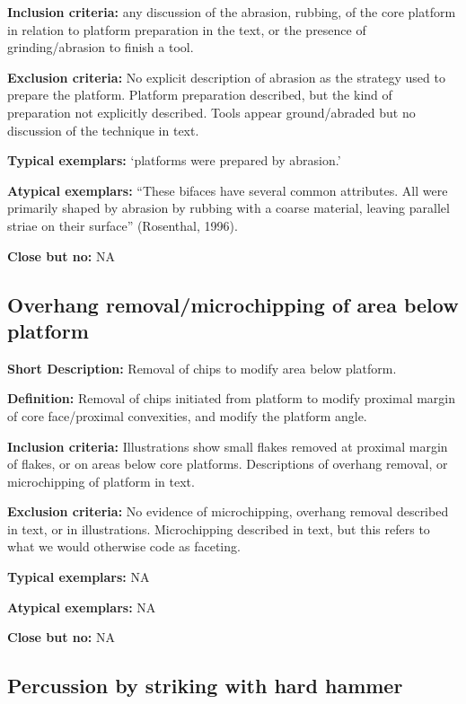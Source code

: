 \documentclass[
]{article}
\begin{document}
\textbf{Inclusion criteria:} any discussion of the abrasion, rubbing, of
the core platform in relation to platform preparation in the text, or
the presence of grinding/abrasion to finish a tool.

\textbf{Exclusion criteria:} No explicit description of abrasion as the
strategy used to prepare the platform. Platform preparation described,
but the kind of preparation not explicitly described. Tools appear
ground/abraded but no discussion of the technique in text.

\textbf{Typical exemplars:} `platforms were prepared by abrasion.'

\textbf{Atypical exemplars:} ``These bifaces have several common
attributes. All were primarily shaped by abrasion by rubbing with a
coarse material, leaving parallel striae on their surface'' (Rosenthal,
1996).

\textbf{Close but no:} NA

\hypertarget{overhang-removalmicrochipping-of-area-below-platform}{%
\subsection{Overhang removal/microchipping of area below
platform}\label{overhang-removalmicrochipping-of-area-below-platform}}

\textbf{Short Description:} Removal of chips to modify area below
platform.

\textbf{Definition:} Removal of chips initiated from platform to modify
proximal margin of core face/proximal convexities, and modify the
platform angle.

\textbf{Inclusion criteria:} Illustrations show small flakes removed at
proximal margin of flakes, or on areas below core platforms.
Descriptions of overhang removal, or microchipping of platform in text.

\textbf{Exclusion criteria:} No evidence of microchipping, overhang
removal described in text, or in illustrations. Microchipping described
in text, but this refers to what we would otherwise code as faceting.

\textbf{Typical exemplars:} NA

\textbf{Atypical exemplars:} NA

\textbf{Close but no:} NA

\hypertarget{percussion-by-striking-with-hard-hammer}{%
\subsection{Percussion by striking with hard
hammer}\label{percussion-by-striking-with-hard-hammer}}
\end{document}
